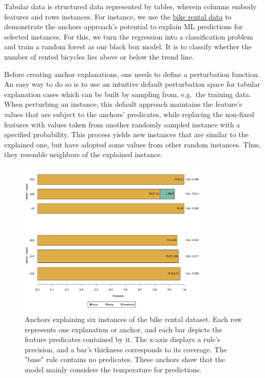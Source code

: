 \documentclass[
  11pt,
]{scrbook}
\begin{document}
Tabular data is structured data represented by tables, wherein columns embody features and rows instances.
For instance, we use the \protect\hyperlink{bike-data}{bike rental data} to demonstrate the anchors approach's potential to explain ML predictions for selected instances. For this, we turn the regression into a classification problem and train a random forest as our black box model. It is to classify whether the number of rented bicycles lies above or below the trend line.

Before creating anchor explanations, one needs to define a perturbation function.
An easy way to do so is to use an intuitive default perturbation space for tabular explanation cases which can be built by sampling from, e.g.~the training data.
When perturbing an instance, this default approach maintains the feature's values that are subject to the anchors' predicates, while replacing the non-fixed features with values taken from another randomly sampled instance with a specified probability.
This process yields new instances that are similar to the explained one, but have adopted some values from other random instances.
Thus, they resemble neighbors of the explained instance.

\begin{figure}

{\centering \includegraphics[width=0.8\textwidth]{images/unnamed-chunk-33-1} 

}

\caption{Anchors explaining six instances of the bike rental dataset. Each row represents one explanation or anchor, and each bar depicts the feature predicates contained by it. The x-axis displays a rule's precision, and a bar's thickness corresponds to its coverage. The "base" rule contains no predicates. These anchors show that the model mainly considers the temperature for predictions.}\label{fig:unnamed-chunk-33}
\end{figure}
\end{document}
